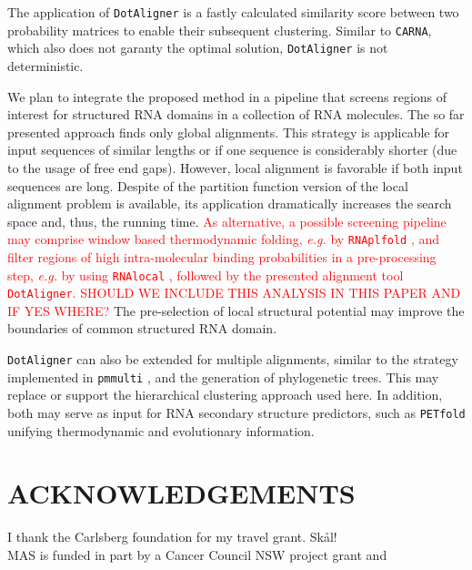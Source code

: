 \documentclass[a4paper,twoside]{article}
\newcommand\dotaligner{\texttt{DotAligner}}
\newcommand\pmmulti{\texttt{pmmulti}}
\newcommand\rnaplfold{\texttt{RNAplfold}}
\newcommand\carna{\texttt{CARNA}}
\newcommand\petfold{\texttt{PETfold}}
\newcommand\rnalocal{\texttt{RNAlocal}}
\newcommand\eg{\textit{e.g.}}
\newcommand{\RED}[1]{\textcolor{red}{#1}}
\begin{document}
\noindent The application of \dotaligner{} is a fastly
calculated similarity score between two probability matrices to enable their
subsequent clustering.  Similar to \carna{}, which also does not garanty the
optimal solution, \dotaligner{} is not deterministic.

We plan to integrate the proposed method in a pipeline that screens regions of
interest for structured RNA domains in a collection of RNA molecules.  The so
far presented approach finds only global alignments. This strategy is
applicable for input sequences of similar lengths or if one sequence is
considerably shorter (due to the usage of free end gaps). However, local
alignment is favorable if both input sequences are long. Despite of the
partition function version of the local alignment problem is available, its
application dramatically increases the search space and, thus, the running
time. \RED{As alternative, a possible screening pipeline may comprise window
based thermodynamic folding, \eg{} by \rnaplfold{}
\cite{Bernhart:Hofacker:Stadler:Local_RNA_base:2006}, and filter regions of
high intra-molecular binding probabilities in a pre-processing step, \eg{} by
using \rnalocal{} \cite{Dotu19908358}, followed by the presented alignment tool
\dotaligner. SHOULD WE INCLUDE THIS ANALYSIS IN THIS PAPER AND IF YES WHERE?}
The pre-selection of local structural potential may improve the boundaries of
common structured RNA domain. 

\dotaligner{} can also be extended for multiple alignments, similar to the strategy
implemented in \pmmulti{} \cite{Hofacker15073017}, and the generation of
phylogenetic trees. This may replace or support the hierarchical clustering
approach used here. In addition, both may serve as input for RNA secondary
structure predictors, such as \petfold{} \cite{Seemann2008} unifying
thermodynamic and evolutionary information. 


\section*{\uppercase{Acknowledgements}}

\noindent I thank the Carlsberg foundation for my travel grant. Sk\aa l! \\
MAS is funded in part by a Cancer Council NSW project grant and 
\vfill

{\small
}
\vfill

\cleardoublepage
\newpage

%
%
\onecolumn
\end{document}
